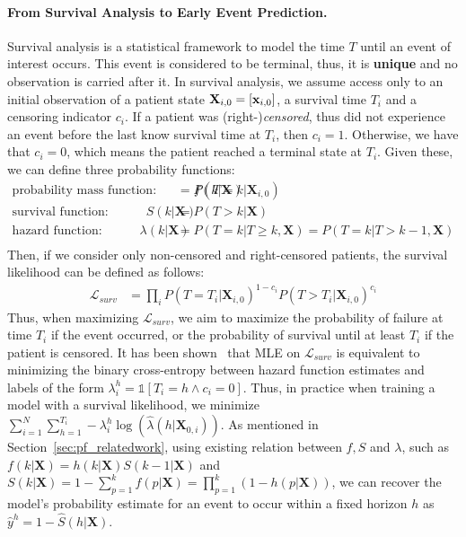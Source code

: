 \documentclass[nohyperref]{article}
\begin{document}
\paragraph{From Survival Analysis to Early Event Prediction.} Survival analysis is a statistical framework to model the time $T$ until an event of
interest occurs. This event is considered to be terminal, thus, it is \textbf{unique} and no observation is carried after it. In survival analysis, we assume access only to an initial observation of a patient state $\operatorname{\mathbf{X}}_{i,0} = [\mathbf{x}_{i,0}]$, a survival time $T_i$ and a censoring indicator $c_i$. If a patient was (right-)\textit{censored}, thus did not experience an event before the last know survival time at $T_i$, then $c_i = 1$. Otherwise, we have that $c_i = 0$, which means the patient reached a terminal state at $T_i$. Given these, we can define three probability functions:
\begin{align*}
    \text{probability mass function:} \quad  \quad  \quad f(k|\mathbf{X}) &= P(T = k | \mathbf{X}_{i,0})\\
    \text{survival function:} \quad \quad  \quad  S(k|\mathbf{X}) &= P(T> k | \mathbf{X})\\
    \text{hazard function:} \quad \quad \quad   \lambda(k|\mathbf{X}) &= P(T = k | T \geq k,\mathbf{X}) = P(T = k | T > k - 1,\mathbf{X})\\
\end{align*}
Then, if we consider only non-censored and right-censored patients, the survival likelihood can be defined as follows:
\begin{align*}
 \mathcal{L}_{surv} &= \prod_i  P(T = T_i | \mathbf{X}_{i,0})^{1-c_i}  P(T > T_i | \mathbf{X}_{i,0})^{c_i}
\end{align*}
Thus, when maximizing $\mathcal{L}_{surv}$, we aim to maximize the probability of failure at time $T_i$ if the event occurred, or the probability of survival until at least $T_i$ if the patient is censored. 
It has been shown~\citep{kalbfleisch2011statistical,craig2021survival} that MLE on $\mathcal{L}_{surv}$ is equivalent to minimizing the binary cross-entropy between hazard function estimates and labels of the form $\lambda^h_i = \mathds{1}\left[T_i = h \land c_i=0\right]$. Thus, in practice when training a model with a survival likelihood, we minimize $ \sum^N_{i=1} \sum^{T_i}_{h=1} - \lambda^h_i\log(\hat{\lambda}(h|\mathbf{X}_{0,i}))$.
As mentioned in Section~\ref{sec:pf_relatedwork}, using existing relation between $f, S$ and $\lambda$, such as $f(k|\mathbf{X}) = h(k|\mathbf{X})S(k-1|\mathbf{X})$ and  $S(k|\mathbf{X}) = 1 - \sum^k_{p=1}f(p|\mathbf{X}) = \prod^k_{p=1}(1-h(p|\mathbf{X}))$, we can recover the model's probability estimate for an event to occur within a fixed horizon $h$ as $\hat{y}^h = 1-\hat{S}(h|\mathbf{X})$.
\end{document}
